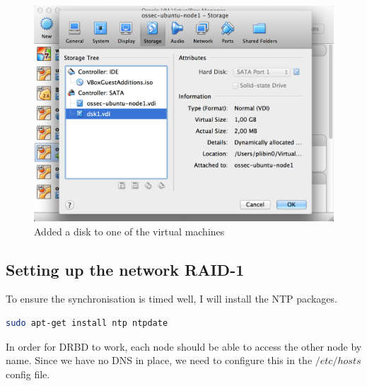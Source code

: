 \documentclass[12pt]{report}
\begin{document}
\begin{figure}[h!]
  \caption{Added a disk to one of the virtual machines}
  \label{fig:add_disk_vbox}
  \centering
    \includegraphics[scale=0.3]{pics/add_disk_vbox.png}
\end{figure}

\subsection{Setting up the network RAID-1}
To ensure the synchronisation is timed well, I will install the NTP packages.
\begin{lstlisting}[language=bash]
sudo apt-get install ntp ntpdate
\end{lstlisting}

In order for DRBD to work, each node should be able to access the
other node by name. Since we have no DNS in place, we need to
configure this in the $/etc/hosts$ config file.
\end{document}
